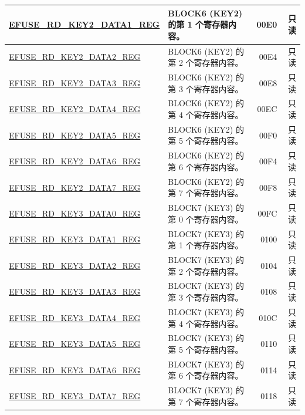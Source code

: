 \begin{longtable}{ | m{6cm} |m{7.2cm} | r| r | }
\hyperref[regdesc:EFUSERDKEY2DATANREG]{EFUSE\_RD\_KEY2\_DATA1\_REG} & BLOCK6 (KEY2) 的第 1 个寄存器内容。 & \hexprefix{}00E0 & 只读 \\ \hline
\hyperref[regdesc:EFUSERDKEY2DATANREG]{EFUSE\_RD\_KEY2\_DATA2\_REG} & BLOCK6 (KEY2) 的第 2 个寄存器内容。 & \hexprefix{}00E4 & 只读 \\ \hline
\hyperref[regdesc:EFUSERDKEY2DATANREG]{EFUSE\_RD\_KEY2\_DATA3\_REG} & BLOCK6 (KEY2) 的第 3 个寄存器内容。 & \hexprefix{}00E8 & 只读 \\ \hline
\hyperref[regdesc:EFUSERDKEY2DATANREG]{EFUSE\_RD\_KEY2\_DATA4\_REG} & BLOCK6 (KEY2) 的第 4 个寄存器内容。 & \hexprefix{}00EC & 只读 \\ \hline
\hyperref[regdesc:EFUSERDKEY2DATANREG]{EFUSE\_RD\_KEY2\_DATA5\_REG} & BLOCK6 (KEY2) 的第 5 个寄存器内容。 & \hexprefix{}00F0 & 只读 \\ \hline
\hyperref[regdesc:EFUSERDKEY2DATANREG]{EFUSE\_RD\_KEY2\_DATA6\_REG} & BLOCK6 (KEY2) 的第 6 个寄存器内容。 & \hexprefix{}00F4 & 只读 \\ \hline
\hyperref[regdesc:EFUSERDKEY2DATANREG]{EFUSE\_RD\_KEY2\_DATA7\_REG} & BLOCK6 (KEY2) 的第 7 个寄存器内容。 & \hexprefix{}00F8 & 只读 \\ \hline
\hyperref[regdesc:EFUSERDKEY3DATANREG]{EFUSE\_RD\_KEY3\_DATA0\_REG} & BLOCK7 (KEY3) 的第 0 个寄存器内容。 & \hexprefix{}00FC & 只读 \\ \hline
\hyperref[regdesc:EFUSERDKEY3DATANREG]{EFUSE\_RD\_KEY3\_DATA1\_REG} & BLOCK7 (KEY3) 的第 1 个寄存器内容。 & \hexprefix{}0100 & 只读 \\ \hline
\hyperref[regdesc:EFUSERDKEY3DATANREG]{EFUSE\_RD\_KEY3\_DATA2\_REG} & BLOCK7 (KEY3) 的第 2 个寄存器内容。 & \hexprefix{}0104 & 只读 \\ \hline
\hyperref[regdesc:EFUSERDKEY3DATANREG]{EFUSE\_RD\_KEY3\_DATA3\_REG} & BLOCK7 (KEY3) 的第 3 个寄存器内容。 & \hexprefix{}0108 & 只读 \\ \hline
\hyperref[regdesc:EFUSERDKEY3DATANREG]{EFUSE\_RD\_KEY3\_DATA4\_REG} & BLOCK7 (KEY3) 的第 4 个寄存器内容。 & \hexprefix{}010C & 只读 \\ \hline
\hyperref[regdesc:EFUSERDKEY3DATANREG]{EFUSE\_RD\_KEY3\_DATA5\_REG} & BLOCK7 (KEY3) 的第 5 个寄存器内容。 & \hexprefix{}0110 & 只读 \\ \hline
\hyperref[regdesc:EFUSERDKEY3DATANREG]{EFUSE\_RD\_KEY3\_DATA6\_REG} & BLOCK7 (KEY3) 的第 6 个寄存器内容。 & \hexprefix{}0114 & 只读 \\ \hline
\hyperref[regdesc:EFUSERDKEY3DATANREG]{EFUSE\_RD\_KEY3\_DATA7\_REG} & BLOCK7 (KEY3) 的第 7 个寄存器内容。 & \hexprefix{}0118 & 只读 \\ \hline

\end{longtable}

